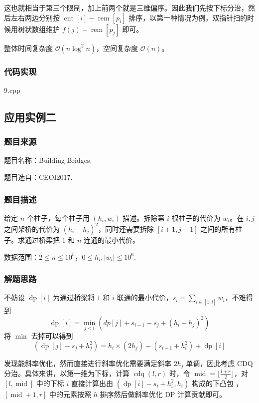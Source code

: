 \documentclass[a4paper, UTF8]{ctexart}
\begin{document}
这也就相当于第三个限制，加上前两个就是三维偏序。因此我们先按下标分治，然后左右两边分别按
\(\operatorname{cnt}[i]-\operatorname{rem}[p_i]\)
排序，以第一种情况为例，双指针扫的时候用树状数组维护
\(f(j)-\operatorname{rem}[p_j]\) 即可。

整体时间复杂度 \(\mathcal{O}(n \log^2 n)\)，空间复杂度
\(\mathcal{O}(n)\)。

\subsubsection{代码实现}

9.cpp

\subsection{应用实例二}

\subsubsection{题目来源}

题目名称：Building Bridges.

题目选自：CEOI2017.

\subsubsection{题目描述}

给定 \(n\) 个柱子，每个柱子用 \((h_i,w_i)\) 描述。拆除第 \(i\)
根柱子的代价为 \(w_i\)。在 \(i,j\) 之间架桥的代价为
\((h_i-h_j)^2\)，同时还需要拆除 \([i+1,j-1]\)
之间的所有柱子。求通过桥梁把 \(1\) 和 \(n\) 连通的最小代价。

数据范围：\(2\leq n\leq 10^5\)，\(0\leq h_i,|w_i|\leq 10^6\).

\subsubsection{解题思路}

不妨设 \(\operatorname{dp}[i]\) 为通过桥梁将 \(1\) 和 \(i\)
联通的最小代价，\(s_i=\sum_{i\in[1,i]}w_i\)，不难得到 \[
\operatorname{dp}[i]=\min_{j < i}(dp[j]+s_{i-1}-s_j+(h_i-h_j)^2)
\] 将 \(\min\) 去掉可以得到 \[
(\operatorname{dp}[j]-s_j+h_j^2)=h_i\times(2h_j)-(s_{i-1}+h_i^2)+\operatorname{dp}[i]
\]

发现能斜率优化，然而直接进行斜率优化需要满足斜率 \(2h_j\) 单调，因此考虑
CDQ 分治。具体来讲，以第一维为下标，计算 \(\operatorname{cdq}(l,r)\)
时，令 \(\operatorname{mid}=\lfloor\frac{l+r}{2}\rfloor\)，对
\([l,\operatorname{mid}]\) 中的下标 \(i\) 直接计算出由
\((\operatorname{dp}[i]-s_i+h_i^2,h_i)\) 构成的下凸包
，\([\operatorname{mid}+1,r]\) 中的元素按照 \(h\) 排序然后做斜率优化 DP
计算贡献即可。
\end{document}
